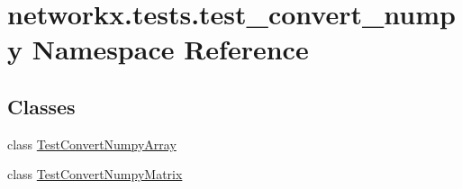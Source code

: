 \hypertarget{namespacenetworkx_1_1tests_1_1test__convert__numpy}{}\section{networkx.\+tests.\+test\+\_\+convert\+\_\+numpy Namespace Reference}
\label{namespacenetworkx_1_1tests_1_1test__convert__numpy}
\subsection*{Classes}
\begin{DoxyCompactItemize}
\item 
class \hyperlink{classnetworkx_1_1tests_1_1test__convert__numpy_1_1TestConvertNumpyArray}{Test\+Convert\+Numpy\+Array}
\item 
class \hyperlink{classnetworkx_1_1tests_1_1test__convert__numpy_1_1TestConvertNumpyMatrix}{Test\+Convert\+Numpy\+Matrix}
\end{DoxyCompactItemize}
